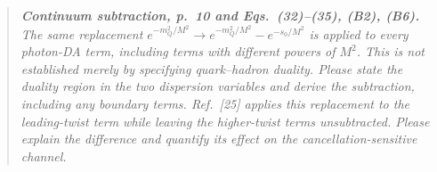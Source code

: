 \begin{quote}
\itshape
\textbf{Continuum subtraction, p.~10 and Eqs.~(32)--(35), (B2), (B6).}
The same replacement
$e^{-m_Q^2/M^2}\to e^{-m_Q^2/M^2}-e^{-s_0/M^2}$
is applied to every photon-DA term, including terms with different powers
of $M^2$. This is not established merely by specifying quark--hadron duality.
Please state the duality region in the two dispersion variables and derive
the subtraction, including any boundary terms. Ref.~[25] applies this
replacement to the leading-twist term while leaving the higher-twist terms
unsubtracted. Please explain the difference and quantify its effect on the
cancellation-sensitive channel.
\end{quote}
